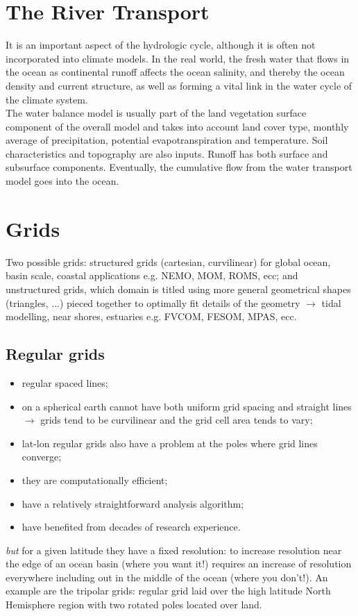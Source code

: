 \section{The River Transport} 

It is an important aspect of the hydrologic cycle, although it is often not incorporated into climate models. In the real world, the fresh water that flows in the ocean as continental runoff affects the ocean salinity, and thereby the ocean density and current structure, as well as forming a vital link in the water cycle of the climate system.\\




The water balance model is usually  part of the land vegetation surface component of the overall model and takes into account land cover type, monthly average of precipitation, potential evapotranspiration and temperature. Soil characteristics and topography are also inputs. Runoff has both surface and subsurface components. Eventually, the cumulative flow from the water transport model goes into the ocean.  

\section{Grids}
Two possible grids: structured grids (cartesian, curvilinear) for global ocean, basin scale, coastal applications e.g. NEMO, MOM, ROMS, ecc; and unstructured grids, which domain is titled using more general geometrical shapes (triangles, ...) pieced together to optimally fit details of the geometry $\rightarrow$ tidal modelling, near shores, estuaries e.g. FVCOM, FESOM, MPAS, ecc.
\subsection{Regular grids}
\begin{itemize}
    \item regular spaced lines;
    \item on a spherical earth cannot have both uniform grid spacing and straight lines $\rightarrow$ grids tend to be curvilinear and the grid cell area tends to vary;
    \item lat-lon regular grids also have a problem at the poles where grid lines converge;
    \item they are computationally efficient;
    \item have a relatively straightforward analysis algorithm;
    \item have benefited from decades of research experience.
\end{itemize}
\textit{but} for a given latitude they have a fixed resolution: to increase resolution near the edge of an ocean basin (where you want it!) requires an increase of resolution everywhere including out in the middle of the ocean (where you don't!). An example are the tripolar grids: regular grid laid over the high latitude North Hemisphere region with two rotated poles located over land. 
